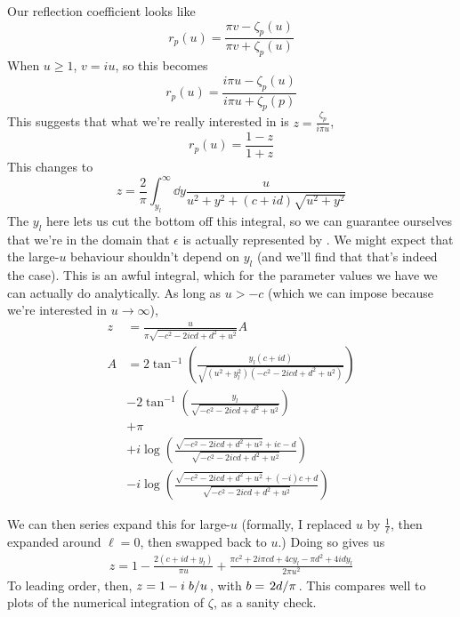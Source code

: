 \documentclass[11pt]{article}
\begin{document}
	Our reflection coefficient looks like
	\begin{equation}
		r_p(u) = \frac{\pi v - \zeta_p(u)}{\pi v + \zeta_p(u)}
	\end{equation}
	When $u \geq 1$, $v = i u$, so this becomes
	\begin{equation}
		r_p(u) = \frac{i \pi u - \zeta_p(u)}{i \pi u + \zeta_p(p)}
	\end{equation}
	This suggests that what we're really interested in is $z = \frac{\zeta_p}{i \pi u}$,
	\begin{equation}
		r_p(u) = \frac{1 - z}{1 + z} \label{eq:rpdef}
	\end{equation}
	This changes  to
	\begin{equation}
		z = \frac{2}{\pi} \int_{y_l}^\infty \dd{y} \frac{u}{u^2 + y^2 + (c + id)\sqrt{u^2 + y^2}}
	\end{equation}
	The $y_l$ here lets us cut the bottom off this integral, so we can guarantee ourselves that we're in the domain that $\epsilon$ is actually represented by .
	We might expect that the large-$u$ behaviour shouldn't depend on $y_l$ (and we'll find that that's indeed the case).
	This is an awful integral, which for the parameter values we have we can actually do analytically.
	As long as $u > -c$ (which we can impose because we're interested in $u \rightarrow \infty$),
	\begin{align}
		z &= \frac{u}{{\pi  \sqrt{-c^2-2 i c d+d^2+u^2}}} A\\
		A &= 2 \tan ^{-1}\left(\frac{y_l (c+i d)}{\sqrt{\left(u^2+y_l^2\right) \left(-c^2-2 i c d+d^2+u^2\right)}}\right)\\
		&-2 \tan ^{-1}\left(\frac{y_l}{\sqrt{-c^2-2 i c d+d^2+u^2}}\right) \\
		&+ \pi \\
		&+i \log \left(\frac{\sqrt{-c^2-2 i c d+d^2+u^2}+i c-d}{\sqrt{-c^2-2 i c d+d^2+u^2}}\right) \\
		&-i \log \left(\frac{\sqrt{-c^2-2 i c d+d^2+u^2}+(-i) c+d}{\sqrt{-c^2-2 i c d+d^2+u^2}}\right)
	\end{align}

	We can then series expand this for large-$u$ (formally, I replaced $u$ by $\frac{1}{\ell}$, then expanded around $\ell = 0$, then swapped back to $u$.)
	Doing so gives us
	\begin{align}
		z = 1 -\frac{2 (c+i d+y_l)}{\pi  u} + \frac{\pi  c^2+2 i \pi  c d+4 c y_l-\pi  d^2+4 i d y_l}{2 \pi  u^2}
	\end{align}
	To leading order, then, $z = 1 - i \flatfrac{b}{u}$, with $b = \flatfrac{2 d}{\pi}$.
	This compares well to plots of the numerical integration of $\zeta$, as a sanity check. 
\end{document}
